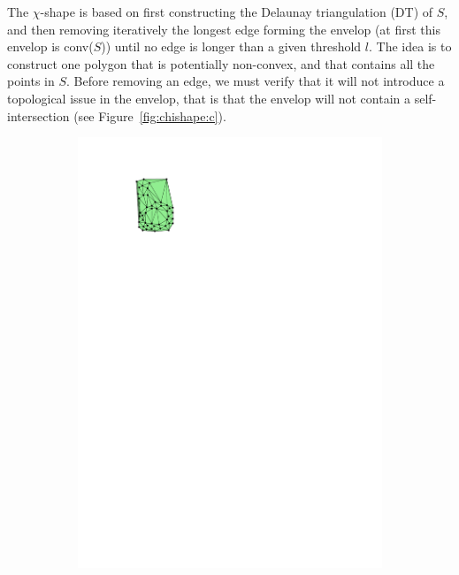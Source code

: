 The $\chi$-shape is based on first constructing the Delaunay triangulation (DT) of $S$, and then removing iteratively the longest edge forming the envelop (at first this envelop is conv($S$)) until no edge is longer than a given threshold $l$.
The idea is to construct one polygon that is potentially non-convex, and that contains all the points in $S$.
Before removing an edge, we must verify that it will not introduce a topological issue in the envelop, that is that the envelop will not contain a self-intersection (see Figure~\ref{fig:chishape:c}). %
\begin{figure}
  \centering
  \begin{subfigure}[b]{0.25\linewidth}
    \centering
    \includegraphics[page=1,width=\textwidth]{figs/chishape.pdf}
    \caption{}
    \label{fig:chishape:a}
  \end{subfigure}

\end{figure}
